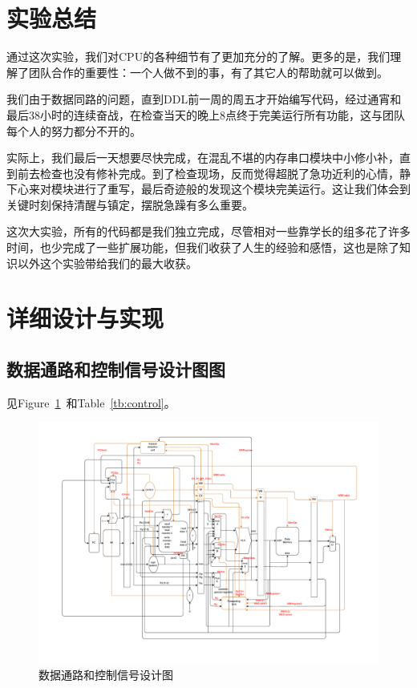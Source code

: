 \documentclass{article}
\begin{document}
\section{实验总结}

通过这次实验，我们对CPU的各种细节有了更加充分的了解。更多的是，我们理解了团队合作的重要性：一个人做不到的事，有了其它人的帮助就可以做到。

我们由于数据同路的问题，直到DDL前一周的周五才开始编写代码，经过通宵和最后38小时的连续奋战，在检查当天的晚上8点终于完美运行所有功能，这与团队每个人的努力都分不开的。

实际上，我们最后一天想要尽快完成，在混乱不堪的内存串口模块中小修小补，直到前去检查也没有修补完成。到了检查现场，反而觉得超脱了急功近利的心情，静下心来对模块进行了重写，最后奇迹般的发现这个模块完美运行。这让我们体会到关键时刻保持清醒与镇定，摆脱急躁有多么重要。

这次大实验，所有的代码都是我们独立完成，尽管相对一些靠学长的组多花了许多时间，也少完成了一些扩展功能，但我们收获了人生的经验和感悟，这也是除了知识以外这个实验带给我们的最大收获。

\section{详细设计与实现}

\subsection{数据通路和控制信号设计图图}

见Figure~\ref{fig:datapath}~和Table~\ref{tb:control}。

\begin{figure}[h]
\centering
\includegraphics[width=1\columnwidth]{datapath.pdf}
\caption{数据通路和控制信号设计图}
\label{fig:datapath}
\end{figure}
\end{document}
